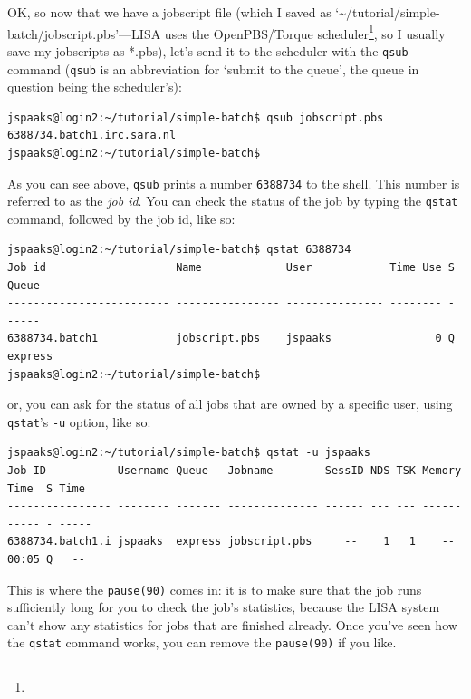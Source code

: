 OK, so now that we have a jobscript file (which I saved as `\textasciitilde{}/tutorial/simple-batch/jobscript.pbs'---LISA uses the OpenPBS/Torque scheduler\footnote{}, so I usually save my jobscripts as *.pbs), let's send it to the scheduler with the \lstinline[style=bashinline]{qsub} command (\lstinline[style=bashinline]{qsub} is an abbreviation for `submit to the queue', the queue in question being the scheduler's):
\begin{lstlisting}[style=basic,style=bash]
jspaaks@login2:~/tutorial/simple-batch$ qsub jobscript.pbs
6388734.batch1.irc.sara.nl
jspaaks@login2:~/tutorial/simple-batch$
\end{lstlisting}

As you can see above, \lstinline[style=bashinline]{qsub} prints a number \lstinline[style=bashinline]{6388734} to the shell. This number is referred to as the \textit{job id}.
You can check the status of the job by typing the \lstinline[style=bashinline]{qstat} command, followed by the job id, like so:
\begin{lstlisting}[style=basic,style=bash]
jspaaks@login2:~/tutorial/simple-batch$ qstat 6388734
Job id                    Name             User            Time Use S Queue
------------------------- ---------------- --------------- -------- - -----
6388734.batch1            jobscript.pbs    jspaaks                0 Q express
jspaaks@login2:~/tutorial/simple-batch$
\end{lstlisting}
or, you can ask for the status of all jobs that are owned by a specific user, using \lstinline[style=bashinline]{qstat}'s \lstinline[style=bashinline]{-u} option, like so:
\begin{lstlisting}[style=basic,style=bash]
jspaaks@login2:~/tutorial/simple-batch$ qstat -u jspaaks
Job ID           Username Queue   Jobname        SessID NDS TSK Memory Time  S Time
---------------- -------- ------- -------------- ------ --- --- ------ ----- - -----
6388734.batch1.i jspaaks  express jobscript.pbs     --    1   1    --  00:05 Q   --
\end{lstlisting}
This is where the \lstinline[style=bashinline]{pause(90)} comes in: it is to make sure that the job runs sufficiently long for you to check the job's statistics, because the LISA system can't show any statistics for jobs that are finished already. Once you've seen how the \lstinline[style=bashinline]{qstat} command works, you can remove the \lstinline[style=bashinline]{pause(90)} if you like.

